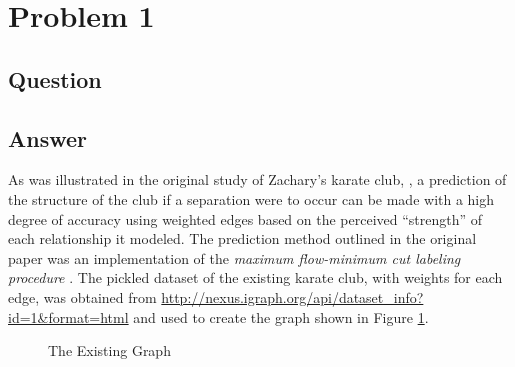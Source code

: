 \section{Problem 1}

\subsection{Question}
\vspace*{10pt}

\clearpage
\subsection{Answer}
As was illustrated in the original study of Zachary's karate club, \cite{wzach77}, a prediction of the structure of the club if a separation were to occur can be made with a high degree of accuracy using weighted edges based on the perceived ``strength'' of each relationship it modeled. The prediction method outlined in the original paper was an implementation of the \textit{maximum flow-minimum cut labeling procedure} \cite{forful62}. The pickled \cite{py:pickle} dataset of the existing karate club, with weights for each edge, was obtained from \url{http://nexus.igraph.org/api/dataset_info?id=1&format=html} and used to create the graph shown in Figure \ref{fig:existing_graph}.

\begin{figure}[h!]
\centering
{}
\caption{The Existing Graph}
\label{fig:existing_graph}
\end{figure}

